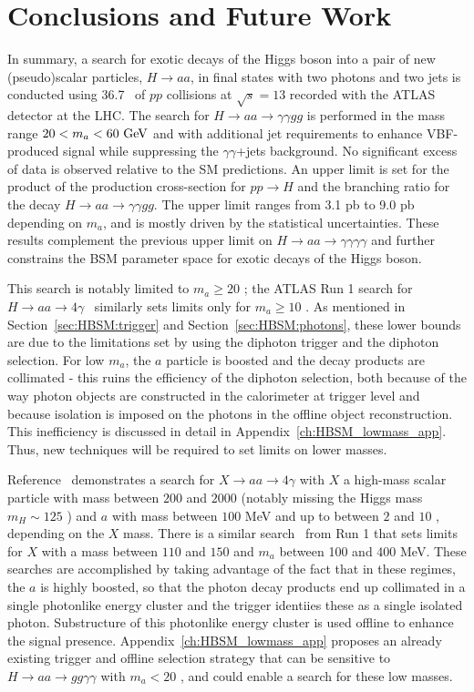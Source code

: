 \section{Conclusions and Future Work}
In summary, a search for exotic decays of the Higgs boson into a pair of new (pseudo)scalar particles,
$H\to aa$, in final states with two photons 
and two jets is conducted using 36.7~\ifb{} of $pp$ collisions at $\sqrt{s}=13$ \TeV{} recorded 
with the ATLAS detector at the LHC. The search for $H\to aa \to \gamma\gamma gg$ is performed
in the mass range $20 < m_a < 60~\mathrm{GeV}{}$ and with additional jet requirements 
to enhance VBF-produced signal while suppressing the $\gamma\gamma$+jets background.
No significant excess of data is observed relative to the SM predictions. An upper limit
is set for the product of the production cross-section for $pp\to H$ and the branching
ratio for the decay $H\to aa\to\gamma\gamma gg$. The upper limit ranges from 3.1 pb to 9.0 pb depending
on $m_a$, and is mostly driven by the statistical uncertainties.
These results complement the previous upper limit on $H\to aa\to\gamma\gamma\gamma\gamma$ and
further constrains the BSM parameter space for exotic decays of the Higgs boson.

This search is notably limited to $m_a\ge20$ \GeV{}; the ATLAS Run 1 search for $H\rightarrow aa \to 4\gamma$~\cite{Aad:2015bua} similarly sets limits only for $m_a\ge10$ \GeV{}.
As mentioned in Section~\ref{sec:HBSM:trigger} and Section~\ref{sec:HBSM:photons}, these lower bounds are due to the limitations set by using the diphoton trigger and the diphoton selection.
For low $m_a$, the $a$ particle is boosted and the decay products are collimated - this ruins the efficiency of the diphoton selection, both because of the way photon objects are constructed in the calorimeter at trigger level and because isolation is imposed on the photons in the offline object reconstruction.
This inefficiency is discussed in detail in Appendix~\ref{ch:HBSM_lowmass_app}.
Thus, new techniques will be required to set limits on lower masses.

Reference~\cite{Aaboud:2018djx} demonstrates a search for $X\rightarrow aa\rightarrow 4\gamma$ with $X$ a high-mass scalar particle with mass between $200$ and $2000$ \GeV{} (notably missing the Higgs mass $m_H\sim 125$ \GeV{}) and $a$ with mass between $100$ MeV and up to between $2$ and $10$ \GeV{}, depending on the $X$ mass.
There is a similar search~\cite{ATLAS-CONF-2012-079} from Run 1 that sets limits for $X$ with a mass between $110$ and $150$ \GeV{} and $m_a$ between 100 and 400 MeV.
These searches are accomplished by taking advantage of the fact that in these regimes, the $a$ is highly boosted, so that the photon decay products end up collimated in a single photonlike energy cluster and the trigger identiies these as a single isolated photon.
Substructure of this photonlike energy cluster is used offline to enhance the signal presence.
Appendix~\ref{ch:HBSM_lowmass_app} proposes an already existing trigger and offline selection strategy that can be sensitive to $H\rightarrow aa\rightarrow gg\gamma\gamma$ with $m_a<20$ \GeV{}, and could enable a search for these low masses.


